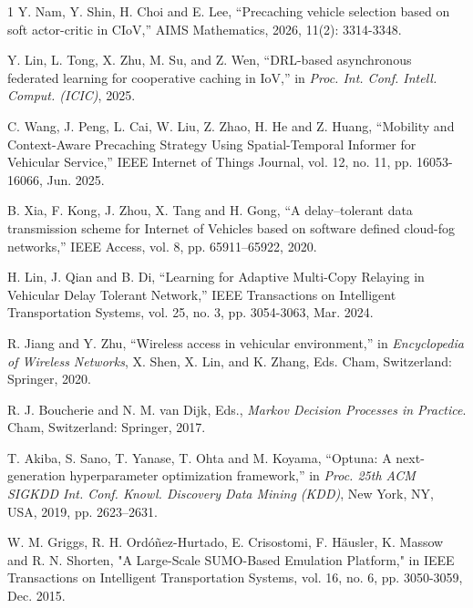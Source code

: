 \begin{thebibliography}{1}
Y. Nam, Y. Shin, H. Choi and E. Lee, ``Precaching vehicle selection based on soft actor-critic in CIoV,'' AIMS Mathematics, 2026, 11(2): 3314-3348.


Y. Lin, L. Tong, X. Zhu, M. Su, and Z. Wen, ``DRL-based asynchronous federated learning for cooperative caching in IoV,'' in \emph{Proc. Int. Conf. Intell. Comput. (ICIC)}, 2025.

C. Wang, J. Peng, L. Cai, W. Liu, Z. Zhao, H. He and Z. Huang, ``Mobility and Context-Aware Precaching Strategy Using Spatial-Temporal Informer for Vehicular Service,'' IEEE Internet of Things Journal, vol. 12, no. 11, pp. 16053-16066, Jun. 2025.

B. Xia, F. Kong, J. Zhou, X. Tang and H. Gong, ``A delay–tolerant data transmission scheme for Internet of Vehicles based on software defined cloud-fog networks,'' IEEE Access, vol. 8, pp. 65911–65922, 2020.

H. Lin, J. Qian and B. Di, ``Learning for Adaptive Multi-Copy Relaying in Vehicular Delay Tolerant Network,'' IEEE Transactions on Intelligent Transportation Systems, vol. 25, no. 3, pp. 3054-3063, Mar. 2024.


R. Jiang and Y. Zhu, ``Wireless access in vehicular environment,'' in \emph{Encyclopedia of Wireless Networks}, X. Shen, X. Lin, and K. Zhang, Eds. Cham, Switzerland: Springer, 2020.

R. J. Boucherie and N. M. van Dijk, Eds., \emph{Markov Decision Processes in Practice}. Cham, Switzerland: Springer, 2017.

T. Akiba, S. Sano, T. Yanase, T. Ohta and M. Koyama, ``Optuna: A next-generation hyperparameter optimization framework,'' in \emph{Proc. 25th ACM SIGKDD Int. Conf. Knowl. Discovery Data Mining (KDD)}, New York, NY, USA, 2019, pp. 2623--2631.

W. M. Griggs, R. H. Ordóñez-Hurtado, E. Crisostomi, F. Häusler, K. Massow and R. N. Shorten, "A Large-Scale SUMO-Based Emulation Platform," in IEEE Transactions on Intelligent Transportation Systems, vol. 16, no. 6, pp. 3050-3059, Dec. 2015.

\end{thebibliography}

